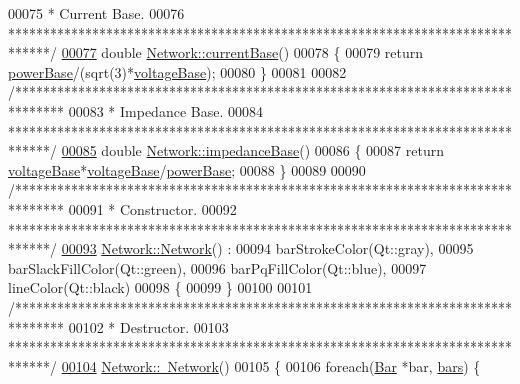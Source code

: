 \begin{DoxyCode}
00075 \textcolor{comment}{ * Current Base.}
00076 \textcolor{comment}{ ******************************************************************************/}
\hypertarget{network_8cpp_source_l00077}{}\hyperlink{group___graphics_ga433bc5c32cf2ce5329bb40b21952d885}{00077} \textcolor{keywordtype}{double} \hyperlink{group___graphics_ga433bc5c32cf2ce5329bb40b21952d885}{Network::currentBase}()
00078 \{
00079   \textcolor{keywordflow}{return} \hyperlink{group___graphics_ga74bb7aa495d422f1f092acdf958df989}{powerBase}/(sqrt(3)*\hyperlink{group___graphics_ga7c1e79d9ac69df9a69f24eaf092fd5e5}{voltageBase});
00080 \}
00081 
00082 \textcolor{comment}{/*******************************************************************************}
00083 \textcolor{comment}{ * Impedance Base.}
00084 \textcolor{comment}{ ******************************************************************************/}
\hypertarget{network_8cpp_source_l00085}{}\hyperlink{group___graphics_gae6794c93d37df113778c37c2c702f6d9}{00085} \textcolor{keywordtype}{double} \hyperlink{group___graphics_gae6794c93d37df113778c37c2c702f6d9}{Network::impedanceBase}()
00086 \{
00087   \textcolor{keywordflow}{return} \hyperlink{group___graphics_ga7c1e79d9ac69df9a69f24eaf092fd5e5}{voltageBase}*\hyperlink{group___graphics_ga7c1e79d9ac69df9a69f24eaf092fd5e5}{voltageBase}/\hyperlink{group___graphics_ga74bb7aa495d422f1f092acdf958df989}{powerBase};
00088 \}
00089 
00090 \textcolor{comment}{/*******************************************************************************}
00091 \textcolor{comment}{ * Constructor.}
00092 \textcolor{comment}{ ******************************************************************************/}
\hypertarget{network_8cpp_source_l00093}{}\hyperlink{group___graphics_ga3cc2fb4f8fa4d507077e8da85ce5a1c8}{00093} \hyperlink{group___graphics_ga3cc2fb4f8fa4d507077e8da85ce5a1c8}{Network::Network}() :
00094   barStrokeColor(Qt::gray),
00095   barSlackFillColor(Qt::green),
00096   barPqFillColor(Qt::blue),
00097   lineColor(Qt::black)
00098 \{
00099 \}
00100 
00101 \textcolor{comment}{/*******************************************************************************}
00102 \textcolor{comment}{ * Destructor.}
00103 \textcolor{comment}{ ******************************************************************************/}
\hypertarget{network_8cpp_source_l00104}{}\hyperlink{group___graphics_ga7a4e19cdb4bf0c7ecf82baa643831492}{00104} \hyperlink{group___graphics_ga7a4e19cdb4bf0c7ecf82baa643831492}{Network::~Network}()
00105 \{
00106   \textcolor{keywordflow}{foreach}(\hyperlink{class_bar}{Bar} *bar, \hyperlink{class_network_a7fe628f7de34a96235cbd3f2cee4aff2}{bars}) \{

\end{DoxyCode}
